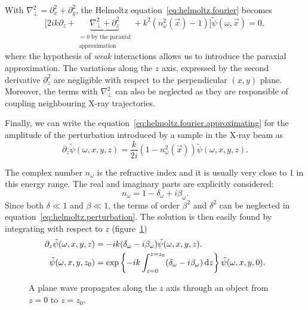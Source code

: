 With  $\nabla_\perp^2 = \partial_x^2 + \partial_y^2$, the Helmoltz
equation~\eqref{eq:helmoltz.fourier} becomes
\begin{equation}
    \big[ 2ik \partial_z + \underbrace{\nabla_\perp^2 +
    \partial^2_z}_{\substack{=0 \text{ by the paraxial} \\
\text{approximation}}} + k^2 (n^2_\omega(\vec{x}) - 1)
\big]\tilde{\psi}(\omega, \vec{x}) = 0,
\label{eq:helmoltz.fourier.approximating}
\end{equation}
where the hypothesis of \emph{weak} interactions allows us to introduce the paraxial
approximation. The variations along the $z$ axis, expressed by the
second derivative $\partial_z^2$ are negligible with
respect to the perpendicular $(x,y)$ plane. Moreover, the terms with
$\nabla_\perp^2$ can also be neglected as they are responsible of coupling
neighbouring X-ray trajectories.

Finally, we can write the equation~\eqref{eq:helmoltz.fourier.approximating}
for the amplitude of the perturbation introduced by a sample in the X-ray
beam as
\begin{equation}
    \partial_z \tilde{\psi}(\omega, x, y, z) =
    \frac{k}{2i}(1 - n^2_\omega(\vec{x}))\tilde{\psi}(\omega, x, y, z).
    \label{eq:helmoltz.perturbation}
\end{equation}

The complex number $n_\omega$ is the refractive index and it is usually
very close to 1 in this energy range. The real and imaginary parts are
explicitly considered:
\begin{equation}
    n_\omega = 1 - \delta_\omega + i\beta_\omega.
\end{equation}
Since both $\delta \ll 1$ and $\beta \ll 1$, the terms of order $\beta^2$ and
$\delta^2$ can be neglected in equation~\eqref{eq:helmoltz.perturbation}.
The solution is then easily found by integrating with respect to $z$
(figure~\ref{fig:propagation})
\begin{align}
    \partial_z \tilde{\psi}(\omega, x, y, z) &=
    -ik(\delta_\omega -i\beta_\omega)\tilde{\psi}(\omega, x, y, z).\\
    \tilde{\psi}(\omega, x, y, z_0) &= \exp\left\{-ik\int_{z=0}^{z=z_0}(\delta_\omega - i
\beta_\omega) \operatorname{d}\!{z} \right\} \tilde{\psi}(\omega, x, y, 0).
\label{eq:helmoltz.solution}
\end{align}

\begin{figure}[htb]
    \centering
    
    \caption[Plane wave propagation.]{A plane wave propagates along the $z$
        axis through an object from $z = 0$ to $z = z_0$.}
    \label{fig:propagation}
\end{figure}

